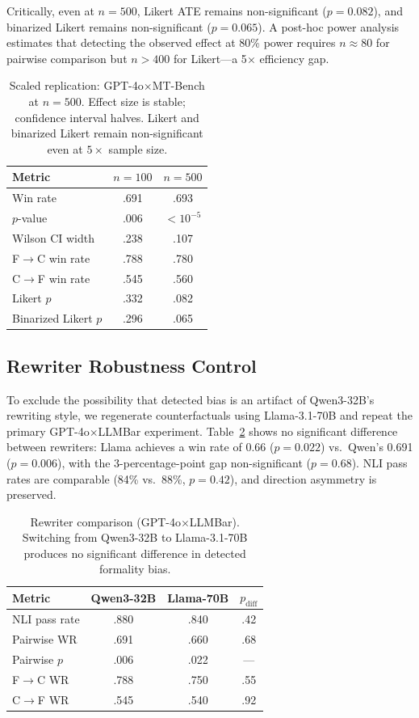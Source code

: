 \documentclass[11pt]{article}
\begin{document}
Critically, even at $n = 500$, Likert ATE remains non-significant ($p = 0.082$), and binarized Likert remains non-significant ($p = 0.065$).
A post-hoc power analysis estimates that detecting the observed effect at 80\% power requires $n \approx 80$ for pairwise comparison but $n > 400$ for Likert---a 5$\times$ efficiency gap.

\begin{table}[t]
\centering
\small
\begin{tabular}{lcc}
\toprule
\textbf{Metric} & $n = 100$ & $n = 500$ \\
\midrule
Win rate & .691 & .693 \\
$p$-value & .006 & $< 10^{-5}$ \\
Wilson CI width & .238 & .107 \\
F$\to$C win rate & .788 & .780 \\
C$\to$F win rate & .545 & .560 \\
Likert $p$ & .332 & .082 \\
Binarized Likert $p$ & .296 & .065 \\
\bottomrule
\end{tabular}
\caption{Scaled replication: GPT-4o$\times$MT-Bench at $n = 500$. Effect size is stable; confidence interval halves. Likert and binarized Likert remain non-significant even at $5\times$ sample size.}
\label{tab:scaled}
\end{table}

\subsection{Rewriter Robustness Control}
\label{sec:rewriter}

To exclude the possibility that detected bias is an artifact of Qwen3-32B's rewriting style, we regenerate counterfactuals using Llama-3.1-70B and repeat the primary GPT-4o$\times$LLMBar experiment.
Table~\ref{tab:rewriter} shows no significant difference between rewriters: Llama achieves a win rate of 0.66 ($p = 0.022$) vs.\ Qwen's 0.691 ($p = 0.006$), with the 3-percentage-point gap non-significant ($p = 0.68$).
NLI pass rates are comparable (84\% vs.\ 88\%, $p = 0.42$), and direction asymmetry is preserved.

\begin{table}[t]
\centering
\small
\begin{tabular}{lccc}
\toprule
\textbf{Metric} & \textbf{Qwen3-32B} & \textbf{Llama-70B} & \textbf{$p_\text{diff}$} \\
\midrule
NLI pass rate & .880 & .840 & .42 \\
Pairwise WR & .691 & .660 & .68 \\
Pairwise $p$ & .006 & .022 & --- \\
F$\to$C WR & .788 & .750 & .55 \\
C$\to$F WR & .545 & .540 & .92 \\
\bottomrule
\end{tabular}
\caption{Rewriter comparison (GPT-4o$\times$LLMBar). Switching from Qwen3-32B to Llama-3.1-70B produces no significant difference in detected formality bias.}
\label{tab:rewriter}
\end{table}
\end{document}
